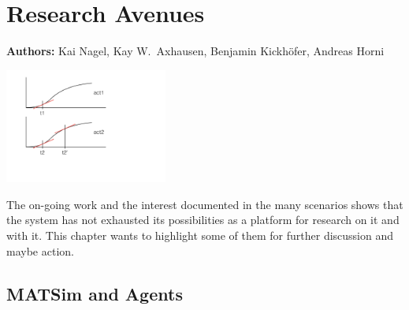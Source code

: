 \chapter{Research Avenues}
\label{ch:researchavenues}

\hfill \textbf{Authors:} Kai Nagel, Kay W.\ Axhausen, Benjamin Kickhöfer, Andreas Horni

\begin{center} \includegraphics[width=0.4\textwidth, angle=0]{figures/stable-activity-allocations} \end{center}

The on-going work and the interest documented in the many scenarios shows 
that the system has not exhausted its possibilities as a platform for research on it and with it. 
This chapter wants to highlight some of them for further discussion and maybe action. 

\section{MATSim and Agents}
\label{sec:matsim-and-agents}


%
%




